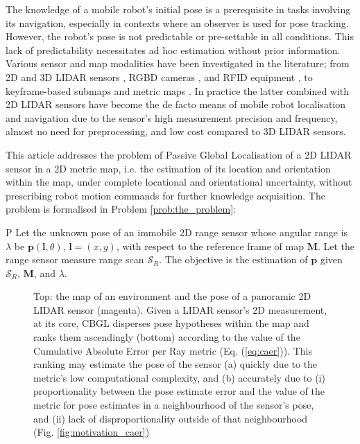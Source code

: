 The knowledge of a mobile robot's initial pose is a prerequisite in tasks
involving its navigation, especially in contexts where an observer is used for
pose tracking. However, the robot's pose is not predictable or pre-settable in
all conditions. This lack of predictability necessitates ad hoc estimation
without prior information. Various sensor and map modalities have been
investigated in the literature; from 2D and 3D LIDAR sensors
\cite{als_eth,Cop2018a}, RGBD cameras \cite{Guo2016}, and RFID equipment
\cite{Tzitzis2023b}, to keyframe-based submaps \cite{Lowry2016} and metric maps
\cite{Rosen2021}. In practice the latter combined with 2D LIDAR sensors have
become the de facto means of mobile robot localisation and navigation due to
the sensor's high measurement precision and frequency, almost no need for
preprocessing, and low cost compared to 3D LIDAR sensors.

This article addresses the problem of Passive Global Localisation of a 2D LIDAR
sensor in a 2D metric map, i.e. the estimation of its location and orientation
within the map, under complete locational and orientational uncertainty,
without prescribing robot motion commands
for further knowledge acquisition. The problem is
formalised in Problem \ref{prob:the_problem}:

\begin{customprb}{P}
  \label{prob:the_problem}
  Let the unknown pose of an immobile 2D range sensor whose angular range is
  $\lambda$ be $\bm{p}(\bm{l},\theta)$, $\bm{l} = (x,y)$, with respect to the
  reference frame of map $\bm{M}$. Let the range sensor measure range scan
  $\mathcal{S}_R$. The objective is the estimation of $\bm{p}$ given
  $\mathcal{S}_R$, $\bm{M}$, and $\lambda$.
\end{customprb}

\begin{figure}\vspace{0.4em}
  
  \vspace{-1.75cm}
  \caption{\small Top: the map of an environment and the pose of a panoramic 2D
           LIDAR sensor (magenta). Given a LIDAR sensor's 2D measurement, at its
           core, CBGL disperses pose hypotheses within the map and ranks them
           ascendingly (bottom) according to the value of the Cumulative
           Absolute Error per Ray metric (Eq. (\ref{eq:caer})). This
           ranking may estimate the pose of the sensor (a) quickly due to the
           metric's low computational complexity, and (b) accurately due to (i)
           proportionality between the pose estimate error and the value of the
           metric for pose estimates in a neighbourhood of the sensor's pose,
           and (ii) lack of disproportionality outside of that neighbourhood
           (Fig. \ref{fig:motivation_caer})
           }
  \label{fig:face}
\end{figure}

